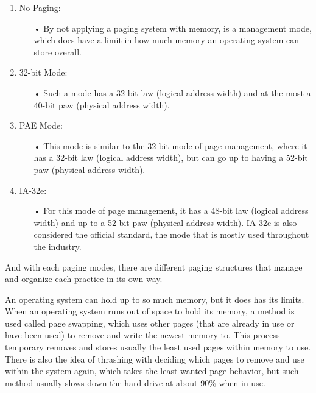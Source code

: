 \documentclass[letterpaper,10pt,onecolumn]{IEEEtran}
\begin{document}
\begin{enumerate}
	\item No Paging:
		\begin{itemize}
			\item[•] By not applying a paging system with memory, is a management mode, which does have a limit in how much memory an operating system can store overall.
		\end{itemize}
	\item 32-bit Mode:
		\begin{itemize}
			\item[•] Such a mode has a 32-bit law (logical address width) and at the most a 40-bit paw (physical address width).
		\end{itemize}
	\item PAE Mode:
		\begin{itemize}
			\item[•] This mode is similar to the 32-bit mode of page management, where it has a 32-bit law (logical address width), but can go up to having a 52-bit paw (physical address width).
		\end{itemize}
	\item IA-32e:
		\begin{itemize}
			\item[•] For this mode of page management, it has a 48-bit law (logical address width) and up to a 52-bit paw (physical address width). IA-32e is also considered the official standard, the mode that is mostly used throughout the industry.
		\end{itemize}
\end{enumerate}

\par \noindent
And with each paging modes, there are different paging structures that manage and organize each practice in its own way.
\par
An operating system can hold up to so much memory, but it does has its limits. When an operating system runs out of space to hold its memory, a method is used called page swapping, which uses other pages (that are already in use or have been used) to remove and write the newest memory to. This process temporary removes and stores usually the least used pages within memory to use. There is also the idea of thrashing with deciding which pages to remove and use within the system again, which takes the least-wanted page behavior, but such method usually slows down the hard drive at about 90\% when in use.

\iffalse
\par
There is something else more that goes after this chunk of information that is explained in my notes from class, but unsure I am unsure how to or if I should add it within this report. Possibly come back to it later and see if it is then more relevant to write in.
\fi
\end{document}
